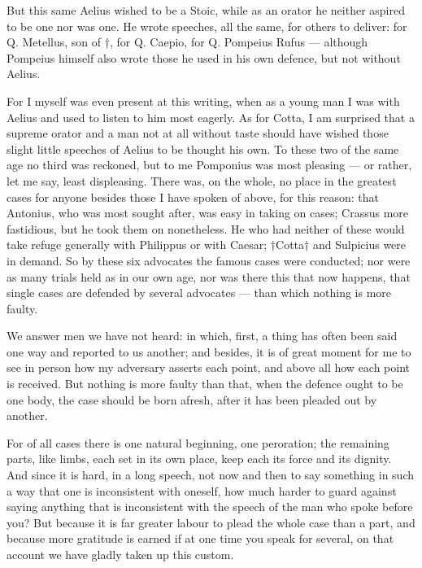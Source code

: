  But this same Aelius wished to be a Stoic, while as an orator he neither aspired to be one nor was one. He wrote speeches, all the same, for others to deliver: for Q. Metellus, son of †, for Q. Caepio, for Q. Pompeius Rufus — although Pompeius himself also wrote those he used in his own defence, but not without Aelius.

 For I myself was even present at this writing, when as a young man I was with Aelius and used to listen to him most eagerly. As for Cotta, I am surprised that a supreme orator and a man not at all without taste should have wished those slight little speeches of Aelius to be thought his own. To these two of the same age no third was reckoned, but to me Pomponius was most pleasing — or rather, let me say, least displeasing. There was, on the whole, no place in the greatest cases for anyone besides those I have spoken of above, for this reason: that Antonius, who was most sought after, was easy in taking on cases; Crassus more fastidious, but he took them on nonetheless. He who had neither of these would take refuge generally with Philippus or with Caesar; †Cotta† and Sulpicius were in demand. So by these six advocates the famous cases were conducted; nor were as many trials held as in our own age, nor was there this that now happens, that single cases are defended by several advocates — than which nothing is more faulty.

 We answer men we have not heard: in which, first, a thing has often been said one way and reported to us another; and besides, it is of great moment for me to see in person how my adversary asserts each point, and above all how each point is received. But nothing is more faulty than that, when the defence ought to be one body, the case should be born afresh, after it has been pleaded out by another.

 For of all cases there is one natural beginning, one peroration; the remaining parts, like limbs, each set in its own place, keep each its force and its dignity. And since it is hard, in a long speech, not now and then to say something in such a way that one is inconsistent with oneself, how much harder to guard against saying anything that is inconsistent with the speech of the man who spoke before you? But because it is far greater labour to plead the whole case than a part, and because more gratitude is earned if at one time you speak for several, on that account we have gladly taken up this custom.

